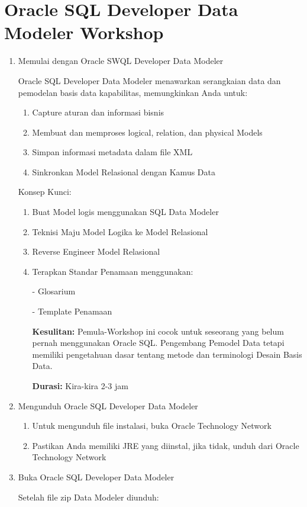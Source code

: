 \documentclass [12pt, times new roman, a4paper]{article}
\begin{document}
\section{Oracle SQL Developer Data Modeler Workshop}
\begin{enumerate}
\item Memulai dengan Oracle SWQL Developer Data Modeler
\par Oracle SQL Developer Data Modeler menawarkan serangkaian data dan pemodelan basis data kapabilitas, memungkinkan Anda untuk:
\begin{enumerate}
\item Capture aturan dan informasi bisnis
\item Membuat dan memproses logical, relation, dan physical Models
\item Simpan informasi metadata dalam file XML
\item Sinkronkan Model Relasional dengan Kamus Data
\end{enumerate}
\par Konsep Kunci:
\begin{enumerate}
\item Buat Model logis menggunakan SQL Data Modeler
\item Teknisi Maju Model Logika ke Model Relasional
\item Reverse Engineer Model Relasional
\item Terapkan Standar Penamaan menggunakan:
\par - Glosarium
\par - Template Penamaan
\par\textbf{Kesulitan:} Pemula-Workshop ini cocok untuk seseorang yang belum pernah menggunakan Oracle SQL. Pengembang Pemodel Data tetapi memiliki pengetahuan dasar tentang metode dan terminologi Desain Basis Data.
\par \textbf{Durasi:} Kira-kira 2-3 jam
\end{enumerate}
\item Mengunduh Oracle SQL Developer Data Modeler
\begin{enumerate}
\item Untuk mengunduh file instalasi, buka Oracle Technology Network
\item Pastikan Anda memiliki JRE yang diinstal, jika tidak, unduh dari Oracle Technology Network
\end{enumerate}
\item Buka Oracle SQL Developer Data Modeler
\par Setelah file zip Data Modeler diunduh:

\end{enumerate}
\end{document}
